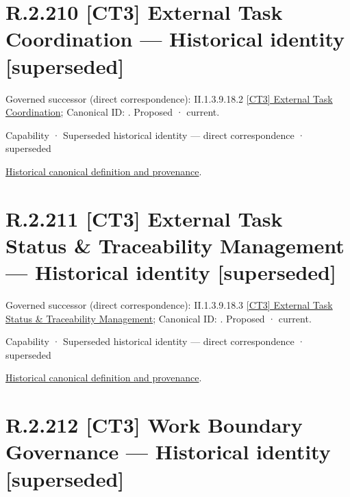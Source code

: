 \section*{R.2.210 [CT3] External Task Coordination — Historical identity [superseded]}
\label{navigation:R.2.210}

{\small Governed successor (direct correspondence): II.1.3.9.18.2 \hyperref[element:ff3447c929724245a13ee864874b5561]{[CT3] External Task Coordination}; Canonical ID: \texttt{}. Proposed · current.}\par
\label{element:32be309d65594592bac4d7b068def0d2}
{\small Capability · Superseded historical identity — direct correspondence · superseded}\par
\href{../../../../continuum/strategy/capability/32be309d65594592bac4d7b068def0d2.md}{Historical canonical definition and provenance}.\par
\section*{R.2.211 [CT3] External Task Status \& Traceability Management — Historical identity [superseded]}
\label{navigation:R.2.211}

{\small Governed successor (direct correspondence): II.1.3.9.18.3 \hyperref[element:b25bb04a8aa94dcfac105a646878ccfc]{[CT3] External Task Status \& Traceability Management}; Canonical ID: \texttt{}. Proposed · current.}\par
\label{element:95985d244a234571892a9e9b4024f594}
{\small Capability · Superseded historical identity — direct correspondence · superseded}\par
\href{../../../../continuum/strategy/capability/95985d244a234571892a9e9b4024f594.md}{Historical canonical definition and provenance}.\par
\section*{R.2.212 [CT3] Work Boundary Governance — Historical identity [superseded]}
\label{navigation:R.2.212}

